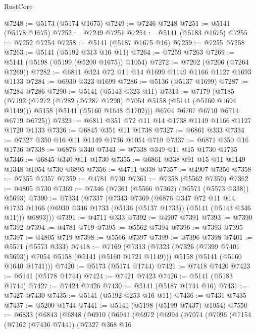 \begin{lexlean}{RustCore}
\begin{coremodule}
@7248 := @5173 (@5174 @1675)
@7249 := @7246 @7248
@7251 := @5141 (@5178 @1675)
@7252 := @7249 @7251
@7254 := @5141 (@5183 @1675)
@7255 := @7252 @7254
@7258 := @5141 (@5187 @1675 @16)
@7259 := @7255 @7258
@7263 := @5141 (@5192 @313 @16 @11)
@7264 := @7259 @7263
@7269 := @5141 (@5198 (@5199 (@5200 @1675)) @1054)
@7272 := @7202 (@7206 (@7264 @7269))
@7282 := @6811 @324 @72 @11 @14 @1699 @1149 @1166 @1127 @1693 @1133
@7284 := @6930 @323 @1699
@7286 := @5136 (@5137 @1699)
@7287 := @7284 @7286
@7290 := @5141 (@5143 @323 @11)
@7313 := @7179
    (@7185
      (@7192
        (@7272
          (@7282 (@7287 @7290) @7054 @5158 (@5141 (@5160 @1694 @1149)))
          @5158
          (@5141 (@5160 @1648 @1702)))
        @6704
        @6707
        @6710
        @6714
        @6719
        @6725))
@7323 := @6811 @351 @72 @11 @14 @1738 @1149 @1166 @1127 @1720 @1133
@7326 := @6845 @351 @11 @1738
@7327 := @6861 @333
@7334 := @7327 @350 @16 @11 @1149 @1736 @1054 @719
@7337 := @6871 @350 @16 @1736
@7338 := @6876 @340
@7343 := @7338 @349 @11 @15 @1730 @1735
@7346 := @6845 @340 @11 @1730
@7355 := @6861 @338 @91 @15 @11 @1149 @1348 @1054 @730 @6895
@7356 := @4711 @338
@7357 := @4907 @7356
@7358 := @7355 @7357
@7359 := @4781 @730
@7361 := @7358 (@5562 @7359)
@7362 := @4805 @730
@7369 := @7346 (@7361 (@5566 @7362) (@5571 (@5573 @338)) @5693)
@7390 := @7334
    (@7337
      (@7343
        @7369
        (@6876
          @347
          @72
          @11
          @14
          @1733
          @1166
          (@6930 @346 @1733 (@5136 (@5137 @1733)) (@5141 (@5143 @346 @11)))
          @6893)))
@7391 := @4711 @333
@7392 := @4907 @7391
@7393 := @7390 @7392
@7394 := @4781 @719
@7395 := @5562 @7394
@7396 := @7393 @7395
@7397 := @4805 @719
@7398 := @5566 @7397
@7399 := @7396 @7398
@7401 := @5571 (@5573 @333)
@7418 := @7169
    (@7313
      (@7323 (@7326 (@7399 @7401 @5693)) @7054 @5158 (@5141 (@5160 @1721 @1149)))
      @5158
      (@5141 (@5160 @1640 @1741)))
@7420 := @5173 (@5174 @1744)
@7421 := @7418 @7420
@7423 := @5141 (@5178 @1744)
@7424 := @7421 @7423
@7426 := @5141 (@5183 @1744)
@7427 := @7424 @7426
@7430 := @5141 (@5187 @1744 @16)
@7431 := @7427 @7430
@7435 := @5141 (@5192 @253 @16 @11)
@7436 := @7431 @7435
@7437 := @5200 @1744
@7441 := @5141 (@5198 (@5199 @7437) @1054)
@7550 := @6833
    (@6843
      (@6848
        (@6910
          (@6941
            (@6972
              (@6994
                (@7074
                  (@7096
                    (@7154
                      (@7162
                        (@7436 @7441)
                        (@7327
                          @368
                          @16

\end{coremodule}
\end{lexlean}

